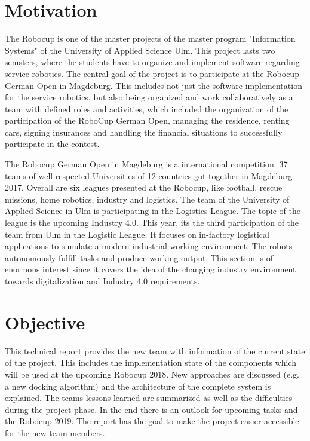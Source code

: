 \section{Motivation}

The Robocup is one of the master projects of the master program "Information Systems" of the University of Applied Science Ulm. This project lasts two semsters, where the students have to organize and implement software regarding service robotics. The central goal of the project is to participate at the Robocup German Open in Magdeburg. This includes not just the software implementation for the service robotics, but also being organized and work collaboratively as a team with defined roles and activities, which included the organization of the participation of the RoboCup German Open, managing the residence, renting cars, signing insurances and handling the financial situations to successfully participate in the contest. 

The Robocup German Open in Magdeburg is a international competition. 37 teams of well-respected Universities of 12 countries got together in Magdeburg 2017. Overall are six leagues presented at the Robocup, like football, rescue missions, home robotics, industry and logistics. The team of the University of Applied Science in Ulm is participating in the Logistics League. The topic of the league is the upcoming Industry 4.0. This year, its the third participation of the team from Ulm in the Logistic League. It focuses on in-factory logistical applications to simulate a modern industrial working environment. The robots autonomously fulfill tasks and produce working output. This section is of enormous interest since it covers the idea of the changing industry environment towards digitalization and Industry 4.0 requirements. 

\section{Objective}

This technical report provides the new team with information of the current state of the project. This includes the implementation state of the components which will be used at the upcoming Robocup 2018. New approaches are discussed (e.g. a new docking algorithm) and the architecture of the complete system is explained. The teams lessons learned are summarized as well as the difficulties during the project phase. In the end there is an outlook for upcoming tasks and the Robocup 2019.
The report has the goal to make the project easier accessible for the new team members.  
